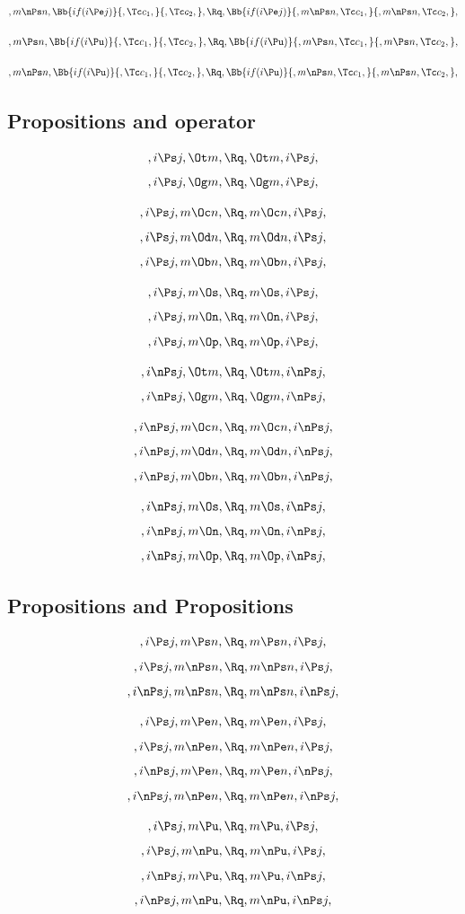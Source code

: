 \[,m \nPs n, \Bb{if(i \Pe j)}{,\Tc c_1,}{,\Tc c_2,}, \Rq , \Bb{if(i \Pe j)}{,m \nPs n,\Tc c_1,}{,m \nPs n,\Tc c_2,},\]
\bigskip
\bigskip

\[,m \Ps n, \Bb{if(i \Pu)}{,\Tc c_1,}{,\Tc c_2,}, \Rq , \Bb{if(i \Pu)}{,m \Ps n,\Tc c_1,}{,m \Ps n,\Tc c_2,},\]
\bigskip
\bigskip

\[,m \nPs n, \Bb{if(i \Pu)}{,\Tc c_1,}{,\Tc c_2,}, \Rq , \Bb{if(i \Pu)}{,m \nPs n,\Tc c_1,}{,m \nPs n,\Tc c_2,},\]
\bigskip
\bigskip


\bigskip
\bigskip
\bigskip
\bigskip
\subsection{Propositions and operator}
\[, i \Ps j, \Ot m, \Rq , \Ot m, i \Ps j,\]
\[, i \Ps j, \Og m, \Rq , \Og m, i \Ps j,\]

\[, i \Ps j, m \Oc n, \Rq , m \Oc n, i \Ps j,\]
\[, i \Ps j, m \Od n, \Rq , m \Od n, i \Ps j,\]
\[, i \Ps j, m \Ob n, \Rq , m \Ob n, i \Ps j,\]

\[, i \Ps j, m \Os, \Rq , m \Os, i \Ps j,\]
\[, i \Ps j, m \On, \Rq , m \On, i \Ps j,\]
\[, i \Ps j, m \Op, \Rq , m \Op, i \Ps j,\]

\bigskip
\bigskip
\[, i \nPs j, \Ot m, \Rq , \Ot m, i \nPs j,\]
\[, i \nPs j, \Og m, \Rq , \Og m, i \nPs j,\]

\[, i \nPs j, m \Oc n, \Rq , m \Oc n, i \nPs j,\]
\[, i \nPs j, m \Od n, \Rq , m \Od n, i \nPs j,\]
\[, i \nPs j, m \Ob n, \Rq , m \Ob n, i \nPs j,\]

\[, i \nPs j, m \Os, \Rq , m \Os, i \nPs j,\]
\[, i \nPs j, m \On, \Rq , m \On, i \nPs j,\]
\[, i \nPs j, m \Op, \Rq , m \Op, i \nPs j,\]

\bigskip
\bigskip
\bigskip
\bigskip
\subsection{ Propositions and Propositions}
\[,i \Ps j, m \Ps n, \Rq , m \Ps n, i \Ps j,\]
\[,i \Ps j, m \nPs n, \Rq , m \nPs n, i \Ps j,\]
\[,i \nPs j, m \nPs n, \Rq , m \nPs n, i \nPs j,\]


\[,i \Ps j, m \Pe n, \Rq , m \Pe n, i \Ps j,\]
\[,i \Ps j, m \nPe n, \Rq , m \nPe n, i \Ps j,\]
\[,i \nPs j, m \Pe n, \Rq , m \Pe n, i \nPs j,\]
\[,i \nPs j, m \nPe n, \Rq , m \nPe n, i \nPs j,\]

\[,i \Ps j, m \Pu, \Rq , m \Pu, i \Ps j,\]
\[,i \Ps j, m \nPu, \Rq , m \nPu, i \Ps j,\]
\[,i \nPs j, m \Pu, \Rq , m \Pu, i \nPs j,\]
\[,i \nPs j, m \nPu, \Rq , m \nPu, i \nPs j,\]


